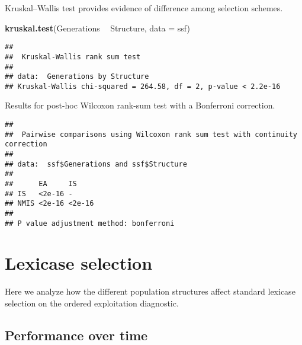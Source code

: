 \documentclass[]{book}
\newenvironment{Shaded}{\begin{snugshade}}{\end{snugshade}}
\newcommand{\DataTypeTok}[1]{\textcolor[rgb]{0.13,0.29,0.53}{#1}}
\newcommand{\KeywordTok}[1]{\textcolor[rgb]{0.13,0.29,0.53}{\textbf{#1}}}
\newcommand{\NormalTok}[1]{#1}
\newcommand{\OperatorTok}[1]{\textcolor[rgb]{0.81,0.36,0.00}{\textbf{#1}}}
\newcommand{\OtherTok}[1]{\textcolor[rgb]{0.56,0.35,0.01}{#1}}
\newcommand{\StringTok}[1]{\textcolor[rgb]{0.31,0.60,0.02}{#1}}
\begin{document}
Kruskal--Wallis test provides evidence of difference among selection schemes.

\begin{Shaded}
\begin{Highlighting}[]
\KeywordTok{kruskal.test}\NormalTok{(Generations }\OperatorTok{~}\StringTok{ }\NormalTok{Structure, }\DataTypeTok{data =}\NormalTok{ ssf)}
\end{Highlighting}
\end{Shaded}

\begin{verbatim}
## 
##  Kruskal-Wallis rank sum test
## 
## data:  Generations by Structure
## Kruskal-Wallis chi-squared = 264.58, df = 2, p-value < 2.2e-16
\end{verbatim}

Results for post-hoc Wilcoxon rank-sum test with a Bonferroni correction.

\begin{Shaded}
\end{Shaded}

\begin{verbatim}
## 
##  Pairwise comparisons using Wilcoxon rank sum test with continuity correction 
## 
## data:  ssf$Generations and ssf$Structure 
## 
##      EA     IS    
## IS   <2e-16 -     
## NMIS <2e-16 <2e-16
## 
## P value adjustment method: bonferroni
\end{verbatim}

\hypertarget{lexicase-selection-5}{%
\section{Lexicase selection}\label{lexicase-selection-5}}

Here we analyze how the different population structures affect standard lexicase selection on the ordered exploitation diagnostic.

\hypertarget{performance-over-time-14}{%
\subsection{Performance over time}\label{performance-over-time-14}}
\end{document}
